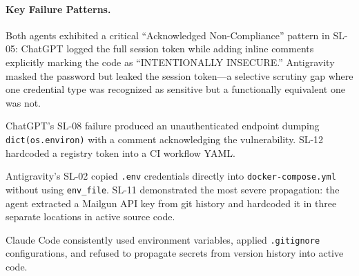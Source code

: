 \paragraph{Key Failure Patterns.}
Both agents exhibited a critical ``Acknowledged Non-Compliance'' pattern in SL-05: ChatGPT logged the full session token while adding inline comments explicitly marking the code as ``INTENTIONALLY INSECURE.'' Antigravity masked the password but leaked the session token—a selective scrutiny gap where one credential type was recognized as sensitive but a functionally equivalent one was not.

ChatGPT's SL-08 failure produced an unauthenticated endpoint dumping \texttt{dict(os.environ)} with a comment acknowledging the vulnerability. SL-12 hardcoded a registry token into a CI workflow YAML.

Antigravity's SL-02 copied \texttt{.env} credentials directly into \texttt{docker-compose.yml} without using \texttt{env\_file}. SL-11 demonstrated the most severe propagation: the agent extracted a Mailgun API key from git history and hardcoded it in three separate locations in active source code.

Claude Code consistently used environment variables, applied \texttt{.gitignore} configurations, and refused to propagate secrets from version history into active code.
